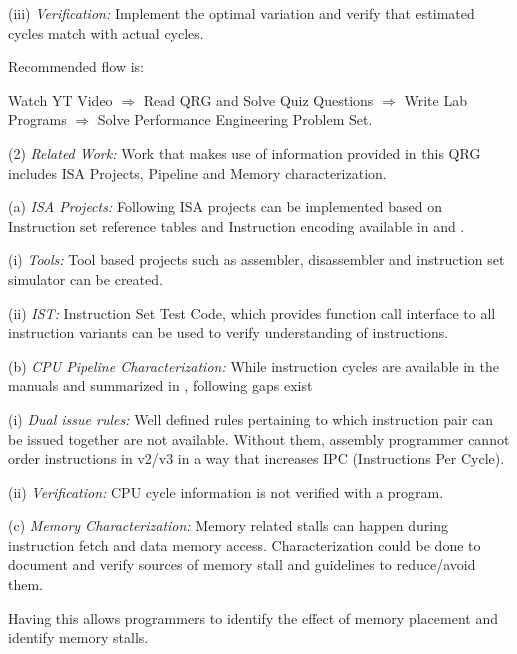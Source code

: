         (iii) \emph{Verification:} %
        Implement the optimal variation and verify that estimated cycles match with actual 
        cycles.

\levelone
Recommended flow is:

    Watch YT Video $\Rightarrow$ Read QRG and Solve Quiz Questions $\Rightarrow$ Write Lab Programs
    $\Rightarrow$ Solve Performance Engineering Problem Set.

\levelone
(2) \emph{Related Work:} %
Work that makes use of information provided in this QRG includes ISA Projects, Pipeline and Memory 
characterization.

    \leveltwo
    (a) \emph{ISA Projects:} %
    Following ISA projects can be implemented based on Instruction set reference tables and 
    Instruction encoding available in 
    and .

        \levelthree
        (i) \emph{Tools:} %
        Tool based projects such as assembler, disassembler and instruction set simulator can
        be created.

        (ii) \emph{IST:} %
        Instruction Set Test Code, which provides function call interface to all instruction
        variants can be used to verify understanding of instructions.

    \leveltwo
    (b) \emph{CPU Pipeline Characterization:} %
    While instruction cycles are available in the manuals and summarized in
    , following gaps exist

        \levelthree
        (i) \emph{Dual issue rules:} %
        Well defined rules pertaining to which instruction pair can be issued together are not 
        available. Without them, assembly programmer cannot order instructions in v2/v3 
        in a way that increases IPC (Instructions Per Cycle).

        (ii) \emph{Verification:} %
        CPU cycle information is not verified with a program.

    \leveltwo
    (c) \emph{Memory Characterization:} %
    Memory related stalls can happen during instruction fetch and data memory access. 
    Characterization could be done to document and verify sources of memory stall and 
    guidelines to reduce/avoid them.

    Having this allows programmers to identify the effect of memory placement and identify
    memory stalls.

